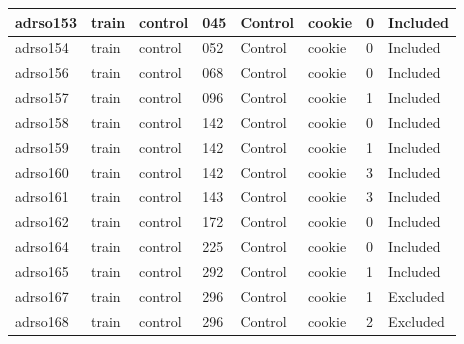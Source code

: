 \begin{center}
\begin{longtable}{|l|l|l|l|l|l|l|l|}
adrso153       & train                 & control           & 045                & Control              & cookie          & 0                & Included      \\ \hline
adrso154       & train                 & control           & 052                & Control              & cookie          & 0                & Included      \\ \hline
adrso156       & train                 & control           & 068                & Control              & cookie          & 0                & Included      \\ \hline
adrso157       & train                 & control           & 096                & Control              & cookie          & 1                & Included      \\ \hline
adrso158       & train                 & control           & 142                & Control              & cookie          & 0                & Included      \\ \hline
adrso159       & train                 & control           & 142                & Control              & cookie          & 1                & Included      \\ \hline
adrso160       & train                 & control           & 142                & Control              & cookie          & 3                & Included      \\ \hline
adrso161       & train                 & control           & 143                & Control              & cookie          & 3                & Included      \\ \hline
adrso162       & train                 & control           & 172                & Control              & cookie          & 0                & Included      \\ \hline
adrso164       & train                 & control           & 225                & Control              & cookie          & 0                & Included      \\ \hline
adrso165       & train                 & control           & 292                & Control              & cookie          & 1                & Included      \\ \hline
adrso167       & train                 & control           & 296                & Control              & cookie          & 1                & Excluded      \\ \hline
adrso168       & train                 & control           & 296                & Control              & cookie          & 2                & Excluded      \\ \hline

\end{longtable}
\end{center}
